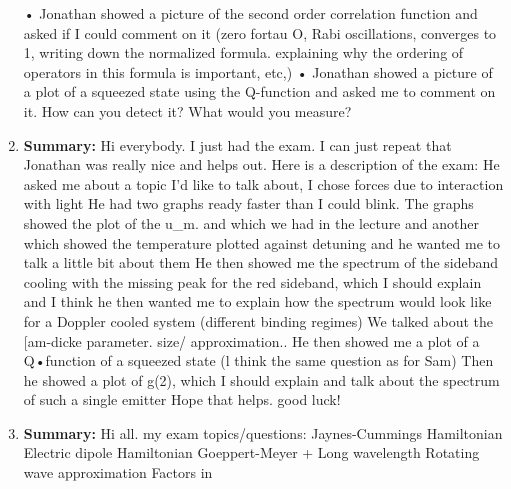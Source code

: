 \documentclass{article}%
\begin{document}
\begin{enumerate}
 • Jonathan showed a picture of the second order correlation function and asked if I could comment on it (zero fortau O, Rabi oscillations, converges to 1, writing down the normalized formula. explaining why the ordering of operators in this formula is important, etc,)\newline%
 • Jonathan showed a picture of a plot of a squeezed state using the Q{-}function and asked me to comment on it. How can you detect it? What would you measure?%
\item%
\begin{mycolorbox}%
\textbf{Summary:}%
\newline%
Hi everybody. I just had the exam. I can just repeat that Jonathan was really nice and helps out. Here is a description of the exam:\newline%
He asked me about a topic I'd like to talk about, I chose forces due to interaction with light\newline%
He had two graphs ready faster than I could blink. The graphs showed the plot of the u\_m. and which we had in the lecture and another which showed the temperature plotted against detuning and he wanted me to talk a little bit about them\newline%
He then showed me the spectrum of the sideband cooling with the missing peak for the red sideband, which I should explain and I think he then wanted me to explain how the spectrum would look like for a Doppler cooled system (different binding regimes)\newline%
We talked about the {[}am{-}dicke parameter. size/ approximation..\newline%
He then showed me a plot of a Q•function of a squeezed state (l think the same question as for Sam)\newline%
Then he showed a plot of g(2), which I should explain and talk about the spectrum of such a single emitter\newline%
Hope that helps. good luck!%
\end{mycolorbox}%
\item%
\textbf{Summary:}%
\newline%
Hi all. my exam topics/questions:\newline%
Jaynes{-}Cummings Hamiltonian\newline%
Electric dipole Hamiltonian\newline%
Goeppert{-}Meyer + Long wavelength\newline%
Rotating wave approximation\newline%
Factors in %

\end{enumerate}
\end{document}
